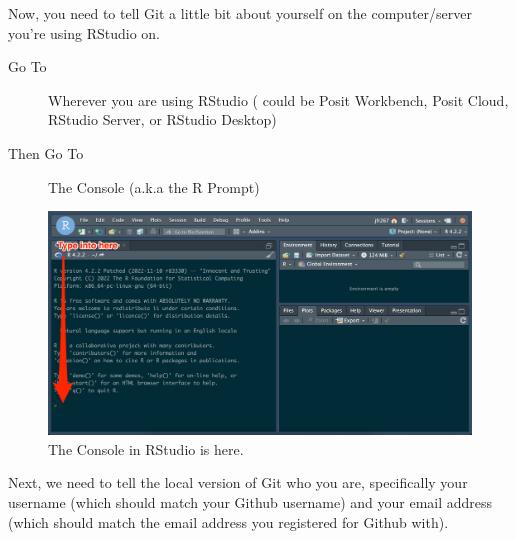 \documentclass[
  letterpaper,
  DIV=11,
  numbers=noendperiod]{scrartcl}
\begin{document}
Now, you need to tell Git a little bit about yourself on the
computer/server you're using RStudio on.

\begin{tcolorbox}[enhanced jigsaw, leftrule=.75mm, colback=white, left=2mm, bottomrule=.15mm, rightrule=.15mm, breakable, arc=.35mm, opacityback=0, colframe=quarto-callout-tip-color-frame, toprule=.15mm]

\textbf{}\vspace{2mm}

\begin{description}
\item[Go To]
Wherever you are using RStudio ( could be Posit Workbench, Posit Cloud,
RStudio Server, or RStudio Desktop)
\item[Then Go To]
The Console (a.k.a the R Prompt)
\end{description}

\end{tcolorbox}

\begin{figure}

{\centering \includegraphics{github_onboarding_assets/rstudio_console.png}

}

\caption{The Console in RStudio is here.}

\end{figure}

Next, we need to tell the local version of Git who you are, specifically
your username (which should match your Github username) and your email
address (which should match the email address you registered for Github
with).
\end{document}
